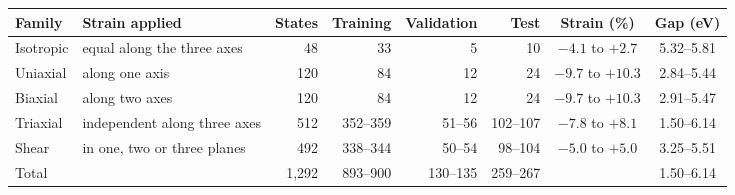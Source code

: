 \begin{tabular}{l>{\raggedright\arraybackslash}p{2.6cm}rrrrcc}
\toprule
\textbf{Family} & \textbf{Strain applied} & \textbf{States} & \textbf{Training} & \textbf{Validation} & \textbf{Test} & \textbf{Strain (\%)} & \textbf{Gap (eV)} \\
\midrule
Isotropic & equal along the three axes & 48 & 33 & 5 & 10 & $-4.1$ to $+2.7$ & 5.32--5.81 \\
Uniaxial & along one axis & 120 & 84 & 12 & 24 & $-9.7$ to $+10.3$ & 2.84--5.44 \\
Biaxial & along two axes & 120 & 84 & 12 & 24 & $-9.7$ to $+10.3$ & 2.91--5.47 \\
Triaxial & independent along three axes & 512 & 352--359 & 51--56 & 102--107 & $-7.8$ to $+8.1$ & 1.50--6.14 \\
Shear & in one, two or three planes & 492 & 338--344 & 50--54 & 98--104 & $-5.0$ to $+5.0$ & 3.25--5.51 \\
\midrule
Total &  & 1{,}292 & 893--900 & 130--135 & 259--267 &  & 1.50--6.14 \\
\bottomrule
\end{tabular}
